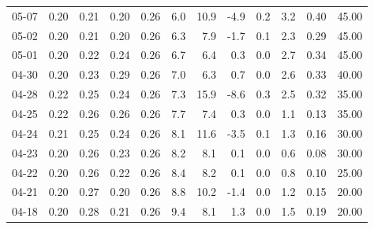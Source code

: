 \begin{threeparttable}
{\begin{tabular}{lrrrrrrrrrrr}
  05-07 &          0.20 &          0.21 &          0.20 &        0.26 &                 6.0 &                10.9 &       -4.9 &                 0.2 &              3.2 &            0.40 &                  45.00 \\
  05-02 &          0.20 &          0.21 &          0.20 &        0.26 &                 6.3 &                 7.9 &       -1.7 &                 0.1 &              2.3 &            0.29 &                  45.00 \\
  05-01 &          0.20 &          0.22 &          0.24 &        0.26 &                 6.7 &                 6.4 &        0.3 &                 0.0 &              2.7 &            0.34 &                  45.00 \\
  04-30 &          0.20 &          0.23 &          0.29 &        0.26 &                 7.0 &                 6.3 &        0.7 &                 0.0 &              2.6 &            0.33 &                  40.00 \\
  04-28 &          0.22 &          0.25 &          0.24 &        0.26 &                 7.3 &                15.9 &       -8.6 &                 0.3 &              2.5 &            0.32 &                  35.00 \\
  04-25 &          0.22 &          0.26 &          0.26 &        0.26 &                 7.7 &                 7.4 &        0.3 &                 0.0 &              1.1 &            0.13 &                  35.00 \\
  04-24 &          0.21 &          0.25 &          0.24 &        0.26 &                 8.1 &                11.6 &       -3.5 &                 0.1 &              1.3 &            0.16 &                  30.00 \\
  04-23 &          0.20 &          0.26 &          0.23 &        0.26 &                 8.2 &                 8.1 &        0.1 &                 0.0 &              0.6 &            0.08 &                  30.00 \\
  04-22 &          0.20 &          0.26 &          0.22 &        0.26 &                 8.4 &                 8.2 &        0.1 &                 0.0 &              0.8 &            0.10 &                  25.00 \\
  04-21 &          0.20 &          0.27 &          0.20 &        0.26 &                 8.8 &                10.2 &       -1.4 &                 0.0 &              1.2 &            0.15 &                  20.00 \\
  04-18 &          0.20 &          0.28 &          0.21 &        0.26 &                 9.4 &                 8.1 &        1.3 &                 0.0 &              1.5 &            0.19 &                  20.00 \\

\end{tabular}}
\end{threeparttable}
